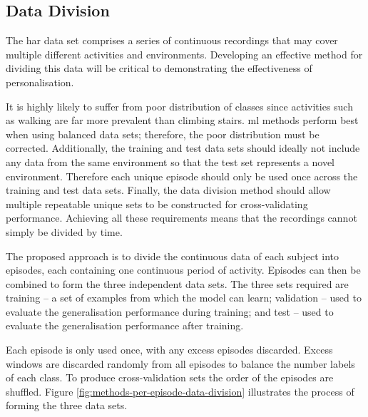 \subsection{Data Division}
The \acrshort{har} data set comprises a series of continuous recordings that may cover multiple different activities and environments. Developing an effective method for dividing this data will be critical to demonstrating the effectiveness of personalisation.

It is highly likely to suffer from poor distribution of classes since activities such as walking are far more prevalent than climbing stairs. \acrshort{ml} methods perform best when using balanced data sets; therefore, the poor distribution must be corrected. Additionally, the training and test data sets should ideally not include any data from the same environment so that the test set represents a novel environment. Therefore each unique episode should only be used once across the training and test data sets. Finally, the data division method should allow multiple repeatable unique sets to be constructed for cross-validating performance. Achieving all these requirements means that the recordings cannot simply be divided by time.

The proposed approach is to divide the continuous data of each subject into episodes, each containing one continuous period of activity. Episodes can then be combined to form the three independent data sets. The three sets required are training -- a set of examples from which the model can learn; validation -- used to evaluate the generalisation performance during training; and test -- used to evaluate the generalisation performance after training.

Each episode is only used once, with any excess episodes discarded. Excess windows are discarded randomly from all episodes to balance the number labels of each class. To produce cross-validation sets the order of the episodes are shuffled. Figure \ref{fig:methods-per-episode-data-division} illustrates the process of forming the three data sets.

